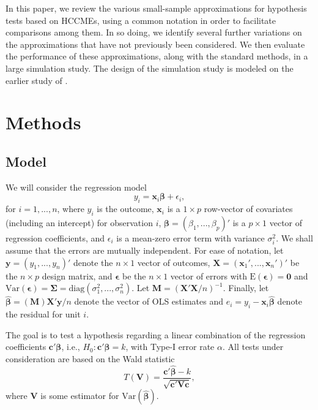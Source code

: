 \documentclass[12pt]{article}\usepackage[]{graphicx}\usepackage[]{color}
\newcommand{\E}{\text{E}}
\newcommand{\Var}{\text{Var}}
\newcommand{\diag}{\text{diag}}
\newcommand{\bm}{\mathbf}
\newcommand{\bs}{\boldsymbol}
\begin{document}
In this paper, we review the various small-sample approximations for hypothesis tests based on HCCMEs, using a common notation in order to facilitate comparisons among them. In so doing, we identify several further variations on the approximations that have not previously been considered. We then evaluate the performance of these approximations, along with the standard methods, in a large simulation study. The design of the simulation study is modeled on the earlier study of \citet{Long2000using}.

\section{Methods}
\label{sec:meth}

\subsection{Model}

We will consider the regression model
\begin{equation}
y_i = \bm{x}_i\bs\beta + \epsilon_i,
\end{equation}
for $i = 1,...,n$, where $y_i$ is the outcome, $\bm{x}_i$ is a $1 \times p$ row-vector of covariates (including an intercept) for observation $i$, $\bs\beta = (\beta_1,...,\beta_p)'$ is a $p \times 1$ vector of regression coefficients, and $\epsilon_i$ is a mean-zero error term with variance $\sigma_i^2$. We shall assume that the errors are mutually independent. For ease of notation, let $\bm{y} = \left(y_1,...,y_n\right)'$ denote the $n \times 1$ vector of outcomes, $\bm{X} = \left(\bm{x}_1',...,\bm{x}_n'\right)'$ be the $n \times p$ design matrix, and $\bs\epsilon$ be the $n \times 1$ vector of errors with $\E\left(\bs\epsilon\right) = \bm{0}$ and $\Var\left(\bs\epsilon\right) = \bs\Sigma = \diag\left(\sigma_1^2,...,\sigma_n^2\right)$. Let $\bm{M} = \left(\bm{X}'\bm{X} / n\right)^{-1}$. Finally, let $\bs{\hat\beta} = \left(\bm{M}\right)\bm{X}'\bm{y} / n$ denote the vector of OLS estimates and $e_i = y_i - \bm{x}_i \bs{\hat\beta}$ denote the residual for unit $i$. 

The goal is to test a hypothesis regarding a linear combination of the regression coefficients $\bm{c}'\bs\beta$, i.e., $H_0: \bm{c}'\bs\beta = k$, with Type-I error rate $\alpha$. All tests under consideration are based on the Wald statistic
\begin{equation}
T(\bm{V}) = \frac{\bm{c}'\bs{\hat\beta} - k}{\sqrt{\bm{c}' \bm{V} \bm{c}}},
\end{equation}
where $\bm{V}$ is some estimator for $\Var\left(\bs{\hat\beta}\right)$. 
\end{document}
